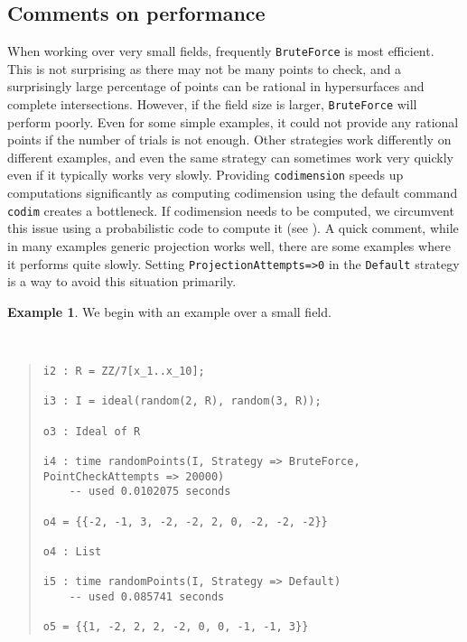 \documentclass[11pt]{amsart}
\theoremstyle{definition}
\newtheorem{example}{Example}[section]
\begin{document}
    \subsection{Comments on performance}

    When working over very small fields, frequently {\tt BruteForce} is most efficient.  This is not surprising as there may not be many points to check, and a surprisingly large percentage of points can be rational in hypersurfaces and complete intersections.  However, if the field size is larger, {\tt BruteForce} will perform poorly.  Even for some simple examples, it could not provide any rational points if the number of trials is not enough. Other strategies work differently on different examples, and even the same strategy can sometimes work very quickly even if it typically works very slowly. Providing {\tt codimension} speeds up computations significantly as computing codimension using the default command {\tt codim} creates a bottleneck. If codimension needs to be computed, we  circumvent this issue using a probabilistic code to compute it (see ). A quick comment, while in many examples generic projection works well, there are some examples where it performs quite slowly.  Setting {\tt ProjectionAttempts=>0} in the {\tt Default} strategy is a way to avoid this situation primarily. 


    \begin{example}
        We begin with an example over a small field.
    {{\small\color{blue}
    ~~
    \begin{quote}
\begin{verbatim}
i2 : R = ZZ/7[x_1..x_10];

i3 : I = ideal(random(2, R), random(3, R));

o3 : Ideal of R

i4 : time randomPoints(I, Strategy => BruteForce, PointCheckAttempts => 20000)
    -- used 0.0102075 seconds
    
o4 = {{-2, -1, 3, -2, -2, 2, 0, -2, -2, -2}}

o4 : List

i5 : time randomPoints(I, Strategy => Default)
    -- used 0.085741 seconds
    
o5 = {{1, -2, 2, 2, -2, 0, 0, -1, -1, 3}}
    \end{verbatim}
\end{quote}\vspace{-1em}
    }}
    \end{example}    
\end{document}

